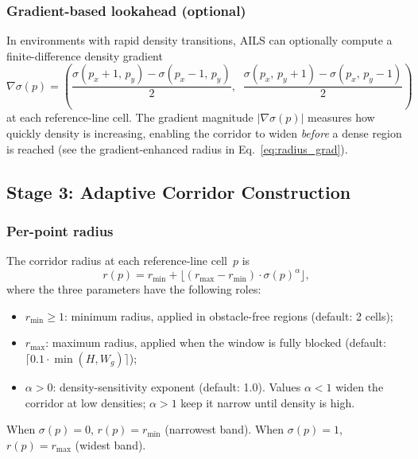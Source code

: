 \documentclass[journal]{IEEEtran}
\begin{document}
\subsubsection{Gradient-based lookahead (optional)}

In environments with rapid density transitions, AILS can optionally compute a finite-difference density gradient
\begin{equation}
    \nabla\sigma(p) = \left(\frac{\sigma(p_x{+}1,\,p_y) - \sigma(p_x{-}1,\,p_y)}{2},\;\;
                             \frac{\sigma(p_x,\,p_y{+}1) - \sigma(p_x,\,p_y{-}1)}{2}\right)
\end{equation}
at each reference-line cell.
The gradient magnitude $|\nabla\sigma(p)|$ measures how quickly density is increasing, enabling the corridor to widen \emph{before} a dense region is reached (see the gradient-enhanced radius in Eq.~\ref{eq:radius_grad}).

\subsection{Stage 3: Adaptive Corridor Construction}
\label{sec:corridor}

\subsubsection{Per-point radius}

The corridor radius at each reference-line cell~$p$ is
\begin{equation}
    r(p) = r_{\min} + \bigl\lfloor(r_{\max} - r_{\min}) \cdot \sigma(p)^{\alpha}\bigr\rfloor,
    \label{eq:radius}
\end{equation}
where the three parameters have the following roles:
\begin{itemize}
    \item $r_{\min} \geq 1$: minimum radius, applied in obstacle-free regions (default: 2 cells);
    \item $r_{\max}$: maximum radius, applied when the window is fully blocked (default: $\lceil 0.1 \cdot \min(H, W_g) \rceil$);
    \item $\alpha > 0$: density-sensitivity exponent (default: 1.0). Values $\alpha < 1$ widen the corridor at low densities; $\alpha > 1$ keep it narrow until density is high.
\end{itemize}

\noindent
When $\sigma(p)=0$, $r(p) = r_{\min}$ (narrowest band). When $\sigma(p)=1$, $r(p) = r_{\max}$ (widest band).
\end{document}
